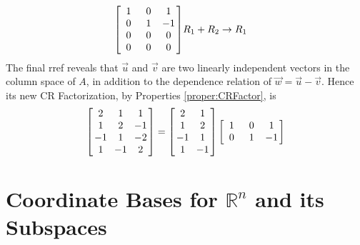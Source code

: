 \begin{solution}
\begin{align*}
\left[
\begin{array}{@{\;}wc{10pt}wc{10pt}wc{10pt}@{\;}}
1 & 0 & 1 \\
0 & 1 & -1 \\
0 & 0 & 0 \\
0 & 0 & 0 
\end{array}
\right] & R_1 + R_2 \to R_1 
\end{align*}
The final rref reveals that $\vec{u}$ and $\vec{v}$ are two linearly independent vectors in the column space of $A$, in addition to the dependence relation of $\vec{w} = \vec{u} - \vec{v}$. Hence its new CR Factorization, by Properties \ref{proper:CRFactor}, is
\begin{align*}
\left[\begin{array}{@{\;}wc{10pt}wc{10pt}wc{10pt}@{\;}}
2 & 1 & 1 \\
1 & 2 & -1 \\
-1 & 1 & -2 \\
1 & -1 & 2 
\end{array}
\right]
=
\left[\begin{array}{@{\;}wc{10pt}wc{10pt}@{\;}}
2 & 1 \\
1 & 2 \\
-1 & 1 \\
1 & -1
\end{array}
\right]
\left[
\begin{array}{@{\;}wc{10pt}wc{10pt}wc{10pt}@{\;}}
1 & 0 & 1 \\
0 & 1 & -1 \\
\end{array}
\right]
\end{align*}
\end{solution}

\section{Coordinate Bases for $\mathbb{R}^n$ and its Subspaces}

